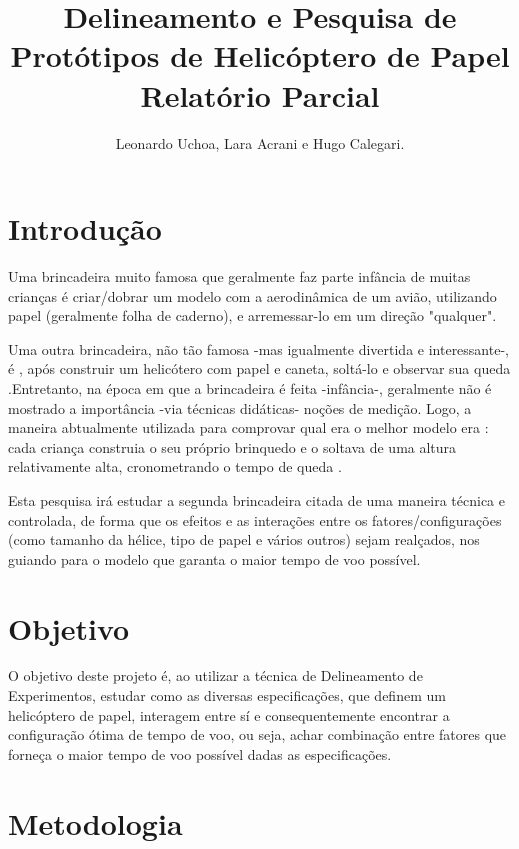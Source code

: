 \documentclass[10pt]{article}
\begin{document}
\title{Delineamento e Pesquisa de Protótipos de Helicóptero de Papel
                  Relatório Parcial}
\author{Leonardo Uchoa, Lara Acrani e Hugo Calegari.}

\date{ }
\maketitle

\cleardoublepage

\tableofcontents

\section{Introdução}

Uma brincadeira muito famosa que geralmente faz parte infância de muitas crianças é criar/dobrar um modelo com a aerodinâmica de um avião, utilizando papel (geralmente  folha de caderno), e arremessar-lo em um direção "qualquer".

Uma outra brincadeira, não tão famosa -mas igualmente divertida e interessante-, é , após construir um helicótero com papel e caneta,  soltá-lo e observar sua queda .Entretanto, na época em que a brincadeira é feita -infância-, geralmente não é mostrado a importância -via técnicas didáticas- noções de medição. Logo, a maneira abtualmente utilizada para comprovar qual era o melhor modelo era : cada criança construia o seu próprio brinquedo e o soltava de uma altura relativamente alta, cronometrando o tempo de queda .

Esta pesquisa  irá estudar a segunda brincadeira citada de uma maneira técnica e controlada, de forma que os efeitos e as interações entre os fatores/configurações (como tamanho da hélice, tipo de papel e vários outros) sejam realçados, nos guiando para o modelo que garanta o maior tempo de voo possível.

\section{Objetivo}
O objetivo deste projeto é, ao utilizar a técnica de Delineamento de Experimentos, estudar como as diversas especificações, que definem um helicóptero de papel, interagem entre sí e consequentemente encontrar a configuração  ótima de tempo de voo, ou seja, achar combinação entre fatores que forneça o maior tempo de voo possível dadas as especificações.

\section{Metodologia}
\end{document}

